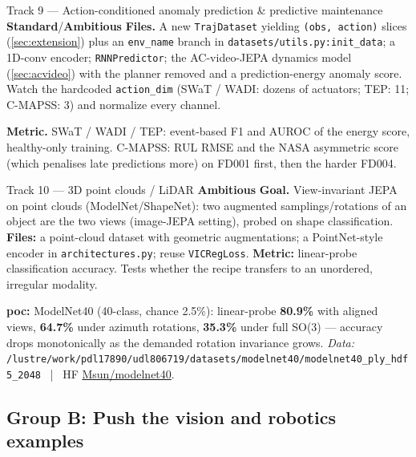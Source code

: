 \documentclass{article}
\newcommand{\code}[1]{\texttt{\small #1}}
\newcommand{\file}[1]{\texttt{\small #1}}
\newcommand{\diffmed}{\colorbox{ebamber!18}{\textcolor{ebamber}{\small\bfseries Standard}}}
\newcommand{\diffhard}{\colorbox{ebred!15}{\textcolor{ebred}{\small\bfseries Ambitious}}}
\begin{document}
\begin{trackbox}{Track 9 --- Action-conditioned anomaly prediction \& predictive maintenance \hfill \diffmed{}/\diffhard{}}
\smallskip
\textbf{Files.} A new \code{TrajDataset} yielding \code{(obs, action)} slices
(\cref{sec:extension}) plus an \code{env\_name} branch in
\file{datasets/utils.py:init\_data}; a 1D-conv encoder; \code{RNNPredictor}; the
AC-video-JEPA dynamics model (\cref{sec:acvideo}) with the planner removed and a
prediction-energy anomaly score. Watch the hardcoded \code{action\_dim}
(SWaT / WADI: dozens of actuators; TEP: 11; C-MAPSS: 3) and normalize every channel.

\smallskip
\textbf{Metric.} SWaT / WADI / TEP: event-based F1 and AUROC of the energy score,
healthy-only training. C-MAPSS: RUL RMSE and the NASA asymmetric score (which
penalises late predictions more) on FD001 first, then the harder FD004.
\end{trackbox}


\begin{trackbox}{Track 10 --- 3D point clouds / LiDAR \hfill \diffhard{}}
\textbf{Goal.} View-invariant JEPA on point clouds (ModelNet/ShapeNet): two
augmented samplings/rotations of an object are the two views (image-JEPA setting),
probed on shape classification. \textbf{Files:} a point-cloud dataset with geometric
augmentations; a PointNet-style encoder in \file{architectures.py}; reuse
\code{VICRegLoss}. \textbf{Metric:} linear-probe classification accuracy. Tests
whether the recipe transfers to an unordered, irregular modality.

\smallskip
\textbf{poc:} ModelNet40 (40-class, chance 2.5\%): linear-probe \textbf{80.9\%} with
aligned views, \textbf{64.7\%} under azimuth rotations, \textbf{35.3\%} under full
SO(3) --- accuracy drops monotonically as the demanded rotation invariance grows.
\emph{Data:} \code{/lustre/work/pdl17890/udl806719/datasets/modelnet40/modelnet40\_ply\_hdf5\_2048}
~|~ HF \href{https://huggingface.co/datasets/Msun/modelnet40}{Msun/modelnet40}.
\end{trackbox}

\subsection{Group B: Push the vision and robotics examples}
\end{document}
